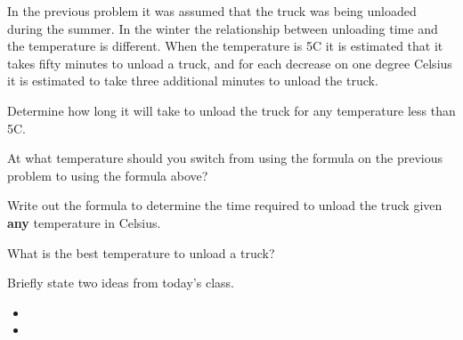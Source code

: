 \begin{problem}
  \clearpage

\item In the previous problem it was assumed that the truck was being
  unloaded during the summer. In the winter the relationship between
  unloading time and the temperature is different. When the
  temperature is 5C it is estimated that it takes fifty minutes to
  unload a truck, and for each decrease on one degree Celsius it is
  estimated to take three additional minutes to unload the truck.
  \begin{subproblem}
    \item Determine how long it will take to unload the truck for any
      temperature less than 5C.
      \vfill
    \item At what temperature should you switch from using the
      formula on the previous problem to using the formula above?
      \vfill
    \item Write out the formula to determine the time required to
      unload the truck given \textbf{any} temperature in Celsius.
      \vspace{3em}
    \item What is the best temperature to unload a truck?
      \vspace{2em}
  \end{subproblem}

\end{problem}

\postClass

\begin{problem}
\item Briefly state two ideas from today's class.
  \begin{itemize}
  \item 
  \item 
  \end{itemize}
\item 
  \begin{subproblem}
    \item
  \end{subproblem}
\end{problem}

